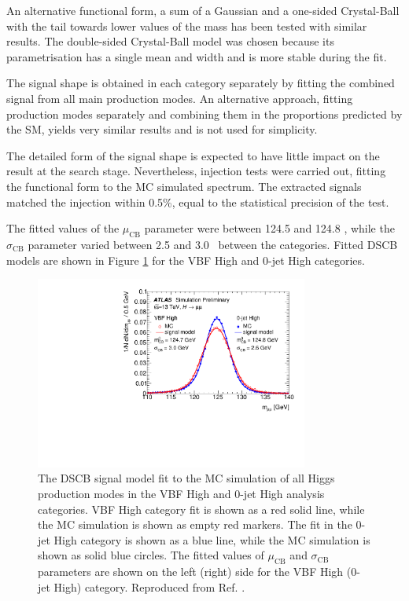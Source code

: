 An alternative functional form, a sum of
a Gaussian and a one-sided Crystal-Ball with the tail towards lower values of the mass has been tested with similar
results. The double-sided Crystal-Ball model was chosen because its
parametrisation has a single mean and width and is more stable
during the fit.

The signal shape is obtained in each category separately by fitting
the combined signal from all main production modes. An alternative
approach, fitting production modes separately and combining them
in the proportions predicted by the SM, yields very similar results
and is not used for simplicity.

The detailed form of the signal shape is expected to have little
impact on the result at the search stage. Nevertheless, injection
tests were carried out, fitting the functional form to the MC simulated
spectrum. The extracted signals matched the injection within 0.5\%,
equal to the statistical precision of the test.

The fitted values of the $\mu_\text{CB}$ parameter were between
124.5 and 124.8 \GeV, while the $\sigma_\text{CB}$ parameter varied
between 2.5 and 3.0 \GeV~between the categories. Fitted DSCB models
are shown in Figure \ref{fig:hmumu:sig-model} for the VBF High and
0-jet High categories.
\begin{figure}[h!]
  \centering
  \includegraphics[width=0.8\textwidth]{figures/hmumu/sig-model}
  \caption[$\hmumu$ signal model]{
  The DSCB signal model fit to the MC simulation of all Higgs production
  modes in the VBF High and 0-jet High analysis categories. VBF High
  category fit is shown as a red solid line, while the MC simulation
  is shown as empty red markers. The fit in the 0-jet High category
  is shown as a blue line, while the MC simulation is shown as solid 
  blue circles. The fitted values of $\mu_\text{CB}$ and
  $\sigma_\text{CB}$ parameters are shown on the left (right) side 
  for the VBF High (0-jet High) category. Reproduced from Ref.
  \cite{ATLAS-CONF-2019-028}.
  }
  \label{fig:hmumu:sig-model}
\end{figure}

